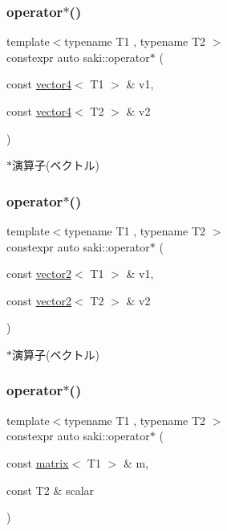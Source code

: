 \subsubsection{\texorpdfstring{operator$\ast$()}{operator*()}\hspace{0.1cm}{\footnotesize\ttfamily [10/14]}}
{\footnotesize\ttfamily template$<$typename T1 , typename T2 $>$ \\
constexpr auto saki\+::operator$\ast$ (\begin{DoxyParamCaption}\item[{const \mbox{\hyperlink{classsaki_1_1vector4}{vector4}}$<$ T1 $>$ \&}]{v1,  }\item[{const \mbox{\hyperlink{classsaki_1_1vector4}{vector4}}$<$ T2 $>$ \&}]{v2 }\end{DoxyParamCaption})}



$\ast$演算子(ベクトル) 

\mbox{\label{namespacesaki_a1db47b2e2e0826325ae66ee6216ba5fc}} 
\subsubsection{\texorpdfstring{operator$\ast$()}{operator*()}\hspace{0.1cm}{\footnotesize\ttfamily [11/14]}}
{\footnotesize\ttfamily template$<$typename T1 , typename T2 $>$ \\
constexpr auto saki\+::operator$\ast$ (\begin{DoxyParamCaption}\item[{const \mbox{\hyperlink{classsaki_1_1vector2}{vector2}}$<$ T1 $>$ \&}]{v1,  }\item[{const \mbox{\hyperlink{classsaki_1_1vector2}{vector2}}$<$ T2 $>$ \&}]{v2 }\end{DoxyParamCaption})}



$\ast$演算子(ベクトル) 

\mbox{\label{namespacesaki_a8ec94b07795582554759e6f844b6055f}} 
\subsubsection{\texorpdfstring{operator$\ast$()}{operator*()}\hspace{0.1cm}{\footnotesize\ttfamily [12/14]}}
{\footnotesize\ttfamily template$<$typename T1 , typename T2 $>$ \\
constexpr auto saki\+::operator$\ast$ (\begin{DoxyParamCaption}\item[{const \mbox{\hyperlink{classsaki_1_1matrix}{matrix}}$<$ T1 $>$ \&}]{m,  }\item[{const T2 \&}]{scalar }\end{DoxyParamCaption})}



